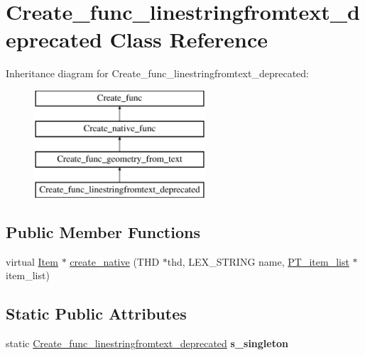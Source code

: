 \hypertarget{classCreate__func__linestringfromtext__deprecated}{}\section{Create\+\_\+func\+\_\+linestringfromtext\+\_\+deprecated Class Reference}
\label{classCreate__func__linestringfromtext__deprecated}
Inheritance diagram for Create\+\_\+func\+\_\+linestringfromtext\+\_\+deprecated\+:\begin{figure}[H]
\begin{center}
\leavevmode
\includegraphics[height=4.000000cm]{classCreate__func__linestringfromtext__deprecated}
\end{center}
\end{figure}
\subsection*{Public Member Functions}
\begin{DoxyCompactItemize}
\item 
virtual \mbox{\hyperlink{classItem}{Item}} $\ast$ \mbox{\hyperlink{classCreate__func__linestringfromtext__deprecated_ada58651e2d023a4363d088fd5370f8af}{create\+\_\+native}} (T\+HD $\ast$thd, L\+E\+X\+\_\+\+S\+T\+R\+I\+NG name, \mbox{\hyperlink{classPT__item__list}{P\+T\+\_\+item\+\_\+list}} $\ast$item\+\_\+list)
\end{DoxyCompactItemize}
\subsection*{Static Public Attributes}
\begin{DoxyCompactItemize}
\item 
\mbox{\label{classCreate__func__linestringfromtext__deprecated_a96ec74ae0c7add13038f761312174554}} 
static \mbox{\hyperlink{classCreate__func__linestringfromtext__deprecated}{Create\+\_\+func\+\_\+linestringfromtext\+\_\+deprecated}} {\bfseries s\+\_\+singleton}
\end{DoxyCompactItemize}

